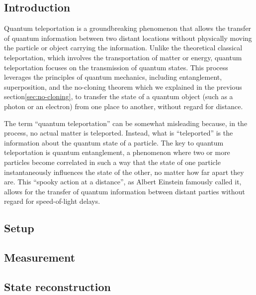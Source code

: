 \subsection{Introduction}\label{subsec:introduction}
Quantum teleportation is a groundbreaking phenomenon that allows the transfer of quantum information
between two distant locations without physically moving the particle or object carrying the information.
Unlike the theoretical classical teleportation, which involves the transportation of matter or energy,
quantum teleportation focuses on the transmission of quantum states.
This process leverages the principles of quantum mechanics, including entanglement, superposition,
and the no-cloning theorem which we explained in the previous section\ref{sec:no-cloning},
to transfer the state of a quantum object (such as a photon or an electron) from one place to another,
without regard for distance.

The term ``quantum teleportation'' can be somewhat misleading because, in the process, no actual matter is teleported.
Instead, what is ``teleported'' is the information about the quantum state of a particle.
The key to quantum teleportation is quantum entanglement,
a phenomenon where two or more particles become correlated in such a way that the state of one particle instantaneously
influences the state of the other, no matter how far apart they are.
This ``spooky action at a distance'', as Albert Einstein famously called it,
allows for the transfer of quantum information between distant parties without regard for speed-of-light delays.

\subsection{Setup}

\subsection{Measurement}

\subsection{State reconstruction}
